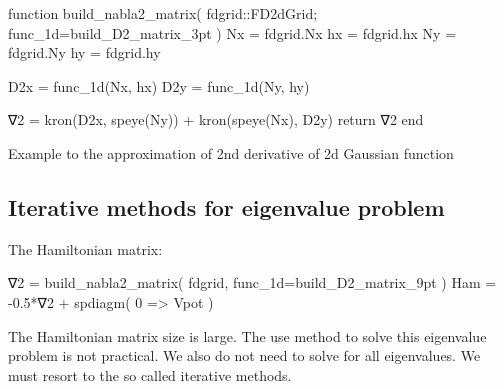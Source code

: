 \begin{juliacode}
function build_nabla2_matrix( fdgrid::FD2dGrid; func_1d=build_D2_matrix_3pt )
    Nx = fdgrid.Nx
    hx = fdgrid.hx
    Ny = fdgrid.Ny
    hy = fdgrid.hy
    
    D2x = func_1d(Nx, hx)
    D2y = func_1d(Ny, hy)

    ∇2 = kron(D2x, speye(Ny)) + kron(speye(Nx), D2y)
    return ∇2
end
\end{juliacode}

Example to the approximation of 2nd derivative of 2d Gaussian function


\subsection{Iterative methods for eigenvalue problem}

The Hamiltonian matrix:
\begin{juliacode}
∇2 = build_nabla2_matrix( fdgrid, func_1d=build_D2_matrix_9pt )
Ham = -0.5*∇2 + spdiagm( 0 => Vpot )
\end{juliacode}

The Hamiltonian matrix size is large. The use  method
to solve this eigenvalue problem is not practical.
We also do not need to solve for all eigenvalues.
We must resort to the
so called iterative methods.

